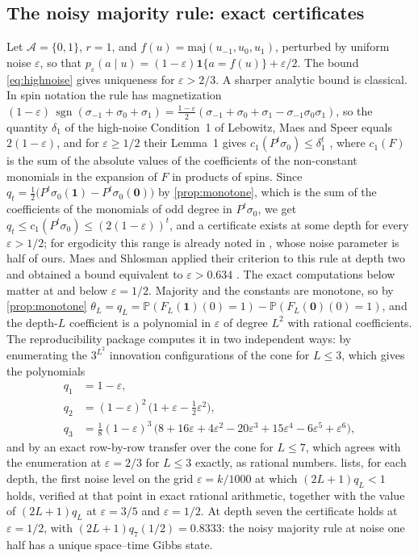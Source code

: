 \documentclass[11pt]{article}
\theoremstyle{plain}
\theoremstyle{definition}
\theoremstyle{remark}
\newcommand{\A}{\mathcal{A}}
\newcommand{\Prob}{\mathbb{P}}
\newcommand{\eps}{\varepsilon}
\newcommand{\sgn}{\operatorname{sgn}}
\begin{document}
\subsection{The noisy majority rule: exact certificates}
\label{sec:majority}

Let $\A=\{0,1\}$, $r=1$, and $f(u)=\mathrm{maj}(u_{-1},u_0,u_1)$, perturbed by uniform noise $\eps$, so that $p_\eps(a\mid u)=(1-\eps)\mathbf 1\{a=f(u)\}+\eps/2$. The bound \eqref{eq:highnoise} gives uniqueness for $\eps>2/3$. A sharper analytic bound is classical. In spin notation the rule has magnetization $(1-\eps)\,\sgn(\sigma_{-1}+\sigma_0+\sigma_1)=\tfrac{1-\eps}2(\sigma_{-1}+\sigma_0+\sigma_1-\sigma_{-1}\sigma_0\sigma_1)$, so the quantity $\delta_1$ of the high-noise Condition~1 of Lebowitz, Maes and Speer equals $2(1-\eps)$, and for $\eps\ge1/2$ their Lemma~1 gives $c_1(P^t\sigma_0)\le\delta_1^t$ \cite[(4.1), (4.10), (4.13)]{LMS90}, where $c_1(F)$ is the sum of the absolute values of the coefficients of the non-constant monomials in the expansion of $F$ in products of spins. Since $q_t=\tfrac12\bigl(P^t\sigma_0(\mathbf 1)-P^t\sigma_0(\mathbf 0)\bigr)$ by \cref{prop:monotone}, which is the sum of the coefficients of the monomials of odd degree in $P^t\sigma_0$, we get $q_t\le c_1(P^t\sigma_0)\le(2(1-\eps))^t$, and a certificate exists at some depth for every $\eps>1/2$; for ergodicity this range is already noted in \cite[Example~1.1]{LMS90}, whose noise parameter is half of ours. Maes and Shlosman applied their criterion to this rule at depth two and obtained a bound equivalent to $\eps>0.634$ \cite[Section~5]{MS91}. The exact computations below matter at and below $\eps=1/2$. Majority and the constants are monotone, so by \cref{prop:monotone} $\theta_L=q_L=\Prob(F_L(\mathbf 1)(0)=1)-\Prob(F_L(\mathbf 0)(0)=1)$, and the depth-$L$ coefficient is a polynomial in $\eps$ of degree $L^2$ with rational coefficients. The reproducibility package computes it in two independent ways: by enumerating the $3^{L^2}$ innovation configurations of the cone for $L\le3$, which gives the polynomials
\begin{align*}
q_1&=1-\eps,\\
q_2&=(1-\eps)^2\,\bigl(1+\eps-\tfrac12\eps^2\bigr),\\
q_3&=\tfrac18(1-\eps)^3\,\bigl(8+16\eps+4\eps^2-20\eps^3+15\eps^4-6\eps^5+\eps^6\bigr),
\end{align*}
and by an exact row-by-row transfer over the cone for $L\le7$, which agrees with the enumeration at $\eps=2/3$ for $L\le3$ exactly, as rational numbers.  lists, for each depth, the first noise level on the grid $\eps=k/1000$ at which $(2L+1)q_L<1$ holds, verified at that point in exact rational arithmetic, together with the value of $(2L+1)q_L$ at $\eps=3/5$ and $\eps=1/2$. At depth seven the certificate holds at $\eps=1/2$, with $(2L+1)q_7(1/2)=0.8333$: the noisy majority rule at noise one half has a unique space--time Gibbs state.
\end{document}
